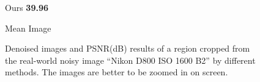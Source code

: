 \begin{figure}[t!]
{\begin{minipage}[t]{0.19\textwidth}
{\footnotesize Ours \textbf{39.96}}
\end{minipage}
\begin{minipage}[t]{0.19\textwidth}
\centering
{}
{\footnotesize Mean Image}
\end{minipage}
}\vspace{-3mm}
\caption{Denoised images and PSNR(dB) results of a region cropped from the real-world noisy image ``Nikon D800 ISO 1600 B2'' \cite{crosschannel2016} by different methods. The images are better to be zoomed in on screen.}
    \label{fig3-16}
\end{figure}


